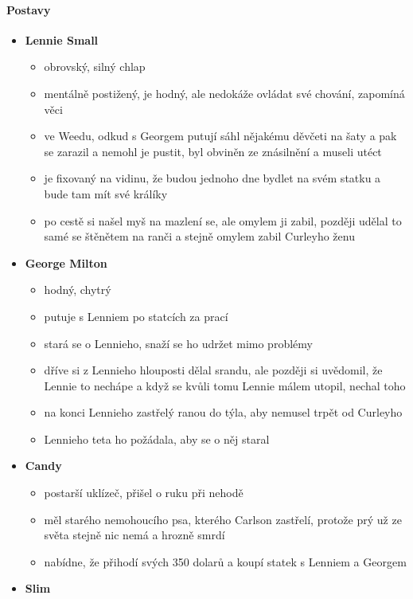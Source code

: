 \documentclass[10pt,a4paper]{article}
\begin{document}
\paragraph{Postavy}
\begin{itemize}
\item \textbf{Lennie Small}
	\begin{itemize}
	\item obrovský, silný chlap
	\item mentálně postižený, je hodný, ale nedokáže ovládat své chování, zapomíná věci
	\item ve Weedu, odkud s Georgem putují sáhl nějakému děvčeti na šaty a pak se zarazil a nemohl je pustit, byl obviněn ze znásilnění a museli utéct
	\item je fixovaný na vidinu, že budou jednoho dne bydlet na svém statku a bude tam mít své králíky
	\item po cestě si našel myš na mazlení se, ale omylem ji zabil, později udělal to samé se štěnětem na ranči a stejně omylem zabil Curleyho ženu
	\end{itemize}
\item \textbf{George Milton}
	\begin{itemize}
	\item hodný, chytrý
	\item putuje s Lenniem po statcích za prací
	\item stará se o Lennieho, snaží se ho udržet mimo problémy
	\item dříve si z Lennieho hlouposti dělal srandu, ale později si uvědomil, že Lennie to nechápe a když se kvůli tomu Lennie málem utopil, nechal toho
	\item na konci Lennieho zastřelý ranou do týla, aby nemusel trpět od Curleyho
	\item Lennieho teta ho požádala, aby se o něj staral
	\end{itemize}
\item \textbf{Candy}
	\begin{itemize}
	\item postarší uklízeč, přišel o ruku při nehodě
	\item měl starého nemohoucího psa, kterého Carlson zastřelí, protože prý už ze světa stejně nic nemá a hrozně smrdí
	\item nabídne, že přihodí svých 350 dolarů a koupí statek s Lenniem a Georgem
	\end{itemize}
\item \textbf{Slim}
	\begin{itemize}

\end{itemize}
\end{itemize}
\end{document}
